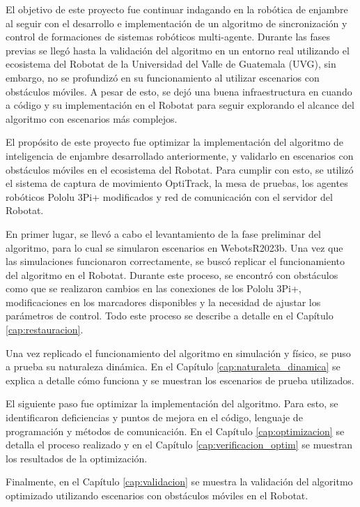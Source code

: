El objetivo de este proyecto fue continuar indagando en la robótica de enjambre al seguir con el desarrollo e implementación de un algoritmo de sincronización y control de formaciones de sistemas robóticos multi-agente. Durante las fases previas se llegó hasta la validación del algoritmo en un entorno real utilizando el ecosistema del Robotat de la Universidad del Valle de Guatemala (UVG), sin embargo, no se profundizó en su funcionamiento al utilizar escenarios con obstáculos móviles. A pesar de esto, se dejó una buena infraestructura en cuando a código y su implementación en el Robotat para seguir explorando el alcance del algoritmo con escenarios más complejos.

El propósito de este proyecto fue optimizar la implementación del algoritmo de inteligencia de enjambre desarrollado anteriormente, y validarlo en escenarios con obstáculos móviles en el ecosistema del Robotat. Para cumplir con esto, se utilizó el sistema de captura de movimiento OptiTrack, la mesa de pruebas, los agentes robóticos Pololu 3Pi+ modificados y red de comunicación con el servidor del Robotat.

En primer lugar, se llevó a cabo el levantamiento de la fase preliminar del algoritmo, para lo cual se simularon escenarios en WebotsR2023b. Una vez que las simulaciones funcionaron correctamente, se buscó replicar el funcionamiento del algoritmo en el Robotat. Durante este proceso, se encontró con obstáculos como que se realizaron cambios en las conexiones de los Pololu 3Pi+, modificaciones en los marcadores disponibles y la necesidad de ajustar los parámetros de control. Todo este proceso se describe a detalle en el Capítulo \ref{cap:restauracion}.

Una vez replicado el funcionamiento del algoritmo en simulación y físico, se puso a prueba su naturaleza dinámica. En el Capítulo \ref{cap:naturaleta_dinamica} se explica a detalle cómo funciona y se muestran los escenarios de prueba utilizados.

El siguiente paso fue optimizar la implementación del algoritmo. Para esto, se identificaron deficiencias y puntos de mejora en el código, lenguaje de programación y métodos de comunicación. En el Capítulo \ref{cap:optimizacion} se detalla el proceso realizado y en el Capítulo \ref{cap:verificacion_optim} se muestran los resultados de la optimización.

Finalmente, en el Capítulo \ref{cap:validacion} se muestra la validación del algoritmo optimizado utilizando escenarios con obstáculos móviles en el Robotat.
